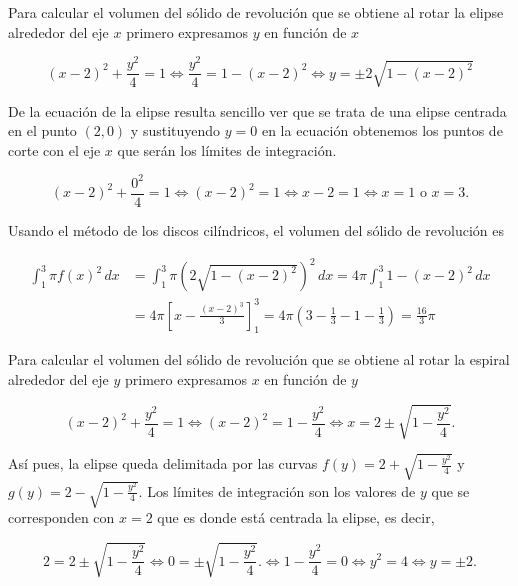 \documentclass[
  spanish,
  a4paper,
]{scrreport}
\theoremstyle{definition}
\theoremstyle{remark}
\begin{document}
\begin{tcolorbox}[enhanced jigsaw, arc=.35mm, bottomrule=.15mm, bottomtitle=1mm, breakable, colback=white, colbacktitle=quarto-callout-tip-color!10!white, colframe=quarto-callout-tip-color-frame, coltitle=black, left=2mm, leftrule=.75mm, opacityback=0, opacitybacktitle=0.6, rightrule=.15mm, title=\textcolor{quarto-callout-tip-color}{\faLightbulb}\hspace{0.5em}{Solución}, titlerule=0mm, toprule=.15mm, toptitle=1mm]

Para calcular el volumen del sólido de revolución que se obtiene al
rotar la elipse alrededor del eje \(x\) primero expresamos \(y\) en
función de \(x\)

\[
(x-2)^2+\frac{y^2}{4} = 1 
\Leftrightarrow  \frac{y^2}{4} = 1-(x-2)^2
\Leftrightarrow y = \pm 2\sqrt{1-(x-2)^2}
\]

De la ecuación de la elipse resulta sencillo ver que se trata de una
elipse centrada en el punto \((2,0)\) y sustituyendo \(y=0\) en la
ecuación obtenemos los puntos de corte con el eje \(x\) que serán los
límites de integración.

\[
(x-2)^2 + \frac{0^2}{4} = 1 
\Leftrightarrow (x-2)^2 = 1
\Leftrightarrow x-2 = 1
\Leftrightarrow  x=1 \mbox{ o } x=3.
\]

Usando el método de los discos cilíndricos, el volumen del sólido de
revolución es

\begin{align*}
\int_1^3 \pi f(x)^2\,dx 
&= \int_1^3 \pi \left(2\sqrt{1-(x-2)^2}\right)^2\,dx
= 4\pi \int_1^3 1-(x-2)^2\,dx \\
&= 4\pi \left[x-\frac{(x-2)^3}{3}\right]_1^3 
= 4\pi \left(3-\frac{1}{3} - 1 -\frac{1}{3}\right) 
= \frac{16}{3}\pi
\end{align*}

Para calcular el volumen del sólido de revolución que se obtiene al
rotar la espiral alrededor del eje \(y\) primero expresamos \(x\) en
función de \(y\)

\[
(x-2)^2+\frac{y^2}{4} = 1
\Leftrightarrow  (x-2)^2 = 1-\frac{y^2}{4}
\Leftrightarrow x = 2 \pm \sqrt{1-\frac{y^2}{4}}.
\]

Así pues, la elipse queda delimitada por las curvas
\(f(y) = 2+\sqrt{1-\frac{y^2}{4}}\) y
\(g(y) = 2-\sqrt{1-\frac{y^2}{4}}\). Los límites de integración son los
valores de \(y\) que se corresponden con \(x=2\) que es donde está
centrada la elipse, es decir,

\[
2 = 2 \pm \sqrt{1-\frac{y^2}{4}}
\Leftrightarrow 0 = \pm \sqrt{1-\frac{y^2}{4}}.
\Leftrightarrow 1-\frac{y^2}{4} = 0
\Leftrightarrow y^2 = 4
\Leftrightarrow y = \pm 2.
\]


\end{tcolorbox}
\end{document}
